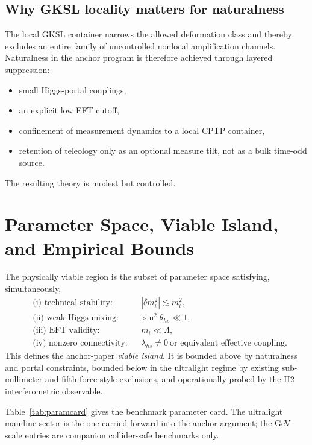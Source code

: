 \documentclass[aps,prd,twocolumn,superscriptaddress,nofootinbib]{revtex4-2}
\begin{document}
\subsection{Why GKSL locality matters for naturalness}
The local GKSL container narrows the allowed deformation class and thereby excludes an entire family of uncontrolled nonlocal amplification channels. Naturalness in the anchor program is therefore achieved through layered suppression:
\begin{itemize}
\item small Higgs-portal couplings,
\item an explicit low EFT cutoff,
\item confinement of measurement dynamics to a local CPTP container,
\item retention of teleology only as an optional measure tilt, not as a bulk time-odd source.
\end{itemize}
The resulting theory is modest but controlled.

\section{Parameter Space, Viable Island, and Empirical Bounds}
The physically viable region is the subset of parameter space satisfying, simultaneously,
\begin{align}
&\text{(i) technical stability:} && |\delta m_i^2|\lesssim m_i^2,\\
&\text{(ii) weak Higgs mixing:} && \sin^2\theta_{hs}\ll 1,\\
&\text{(iii) EFT validity:} && m_i\ll \Lambda,\\
&\text{(iv) nonzero connectivity:} && \lambda_{hs}\neq 0\ \text{or equivalent effective coupling}.
\end{align}
This defines the anchor-paper \emph{viable island}. It is bounded above by naturalness and portal constraints, bounded below in the ultralight regime by existing sub-millimeter and fifth-force style exclusions, and operationally probed by the H2 interferometric observable.

Table~\ref{tab:paramcard} gives the benchmark parameter card. The ultralight mainline sector is the one carried forward into the anchor argument; the GeV-scale entries are companion collider-safe benchmarks only.
\end{document}
